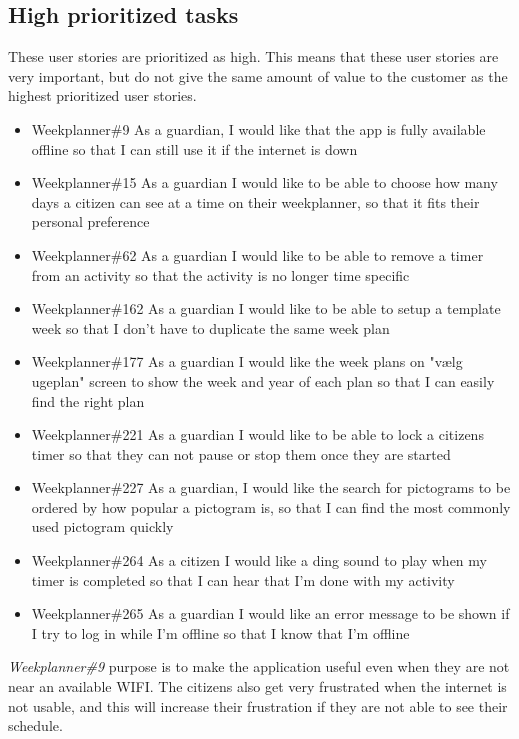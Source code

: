 \subsection{High prioritized tasks}
These user stories are prioritized as high. 
This means that these user stories are very important, but do not give the same amount of value to the customer as the highest prioritized user stories.
\begin{itemize}
    \item Weekplanner\#9 As a guardian, I would like that the app is fully available offline so that I can still use it if the internet is down
    \item Weekplanner\#15 As a guardian I would like to be able to choose how many days a citizen can see at a time on their weekplanner, so that it fits their personal preference 
    \item Weekplanner\#62 As a guardian I would like to be able to remove a timer from an activity so that the activity is no longer time specific
    \item Weekplanner\#162 As a guardian I would like to be able to setup a template week so that I don't have to duplicate the same week plan  
    \item Weekplanner\#177 As a guardian I would like the week plans on "vælg ugeplan" screen to show the week and year of each plan so that I can easily find the right plan 
    \item Weekplanner\#221 As a guardian I would like to be able to lock a citizens timer so that they can not pause or stop them once they are started
    \item Weekplanner\#227 As a guardian, I would like the search for pictograms to be ordered by how popular a pictogram is, so that I can find the most commonly used pictogram quickly
    \item Weekplanner\#264 As a citizen I would like a ding sound to play when my timer is completed so that I can hear that I'm done with my activity
    \item Weekplanner\#265 As a guardian I would like an error message to be shown if I try to log in while I'm offline so that I know that I'm offline
\end{itemize}
\noindent
\textit{Weekplanner\#9} purpose is to make the application useful even when they are not near an available WIFI. 
The citizens also get very frustrated when the internet is not usable, and this will increase their frustration if they are not able to see their schedule.
\\\\
